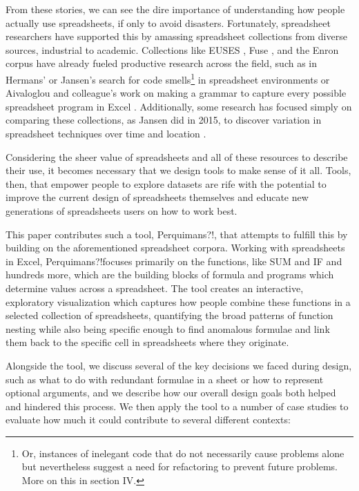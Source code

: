 \documentclass[conference]{IEEEtran}
\newcommand{\toolname}{Perquimans?!}
\begin{document}
	From these stories, we can see the dire importance of understanding how people
	actually use spreadsheets, if only to avoid disasters. Fortunately, spreadsheet
	researchers have supported this by amassing spreadsheet collections from
	diverse sources, industrial to academic. Collections like EUSES
	\cite{fisher2005euses}, Fuse \cite{barik2015fuse}, and the Enron corpus
	\cite{hermans2015enron} have already fueled productive research across the
	field, such as in Hermans' \cite{hermans2012detecting} or Jansen's
	\cite{jansen2015code} search for code smells\footnote{Or, instances of
		inelegant code that do not necessarily cause problems alone but nevertheless
		suggest a need for refactoring to prevent future problems. More on this in
		section IV.} in spreadsheet environments or Aivaloglou and colleague's work on
	making a grammar to capture every possible spreadsheet program in Excel
	\cite{aivaloglou2015grammar}. Additionally, some research has focused simply on
	comparing these collections, as Jansen did in 2015, to discover variation in
	spreadsheet techniques over time and location \cite{jansen2015enron}.
	
	Considering the sheer value of spreadsheets and all of these resources to describe
	their use, it becomes necessary that we design tools to make sense of it all. Tools,
	then, that empower people to explore datasets are rife with the potential to improve
	the current design of spreadsheets themselves and educate new generations of spreadsheets 
	users on how to work best. 

	This paper contributes such a tool, \toolname, that attempts to fulfill this by building on the aforementioned
	spreadsheet corpora. Working with spreadsheets in Excel, \toolname focuses primarily
	on the functions, like SUM and IF and hundreds more, which are the building blocks
	of formula and programs which determine values across a spreadsheet. The tool creates
	an interactive, exploratory visualization which captures how people combine these functions
	in a selected collection of spreadsheets, quantifying the broad patterns of function nesting
	while also being specific enough to find anomalous formulae and link them
	back to the specific cell in spreadsheets where they originate. \par 
	
	Alongside the tool, we discuss several of the key decisions we faced during design,
	such as what to do with redundant formulae in a sheet or how to represent optional
	arguments, and we describe how our overall design goals both helped and hindered this
	process. We then apply the tool to a number of case studies to evaluate how much it
	could contribute to several different contexts:
	
\end{document}

